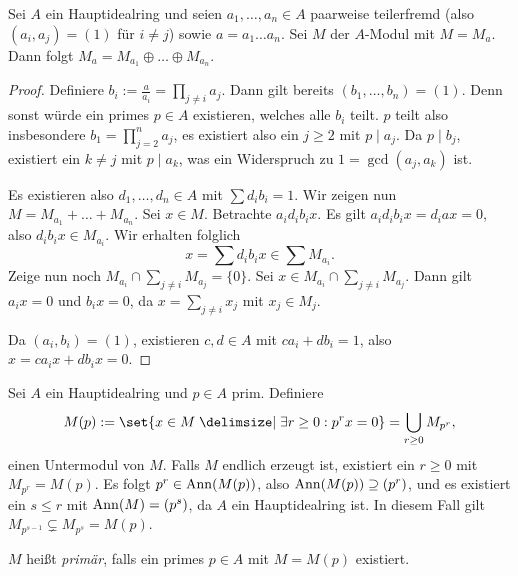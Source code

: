 \documentclass[12pt,a4paper]{scrartcl}
\theoremstyle{cplain}
\theoremstyle{cdef}
\begin{document}
\begin{lem} \label{lem:zerlegung ueber hir}
	Sei $A$ ein Hauptidealring und seien $a_1,\dots, a_n\in A$ paarweise teilerfremd (also $(a_i, a_j) = (1)$ für $i \neq j$) sowie $a = a_1\dots a_n$. Sei $M$ der $A$-Modul mit $M = M_a$. Dann folgt $M_a = M_{a_1}\oplus \dots \oplus M_{a_n}$.
\end{lem}
\begin{proof}
	Definiere $b_i := \frac{a}{a_i} = \prod_{j\neq i} a_j$. Dann gilt bereits $(b_1,\dots, b_n) = (1)$. Denn sonst würde ein primes $p\in A$ existieren, welches alle $b_i$ teilt. $p$ teilt also insbesondere $b_1 = \prod_{j = 2}^n a_j$, es existiert also ein $j\ge 2$ mit $p \mid a_j$. Da $p \mid b_j$, existiert ein $k\neq j$ mit $p \mid a_k$, was ein Widerspruch zu $1 = \gcd(a_j,a_k)$ ist.
	
	Es existieren also $d_1,\dots, d_n\in A$ mit $\sum d_ib_i = 1$. Wir zeigen nun $M = M_{a_1}+\dots +M_{a_n}$. Sei $x\in M$. Betrachte $a_id_ib_ix$. Es gilt $a_id_ib_ix = d_iax = 0$, also $d_ib_ix\in M_{a_i}$. Wir erhalten folglich \[ x = \sum d_ib_ix \in \sum M_{a_i}. \]
	Zeige nun noch $M_{a_i}\cap \sum_{j\neq i}M_{a_j} = \{0\}$. Sei $x\in M_{a_i}\cap\sum_{j \neq i}M_{a_j}$. Dann gilt $a_ix = 0$ und $b_ix = 0$, da $x = \sum_{j \neq i} x_j$ mit $x_j\in M_j$.
	
	Da $(a_i,b_i)= (1)$, existieren $c,d\in A$ mit $ca_i+db_i = 1$, also $x = ca_ix+db_ix = 0$.
\end{proof}

\begin{defi}
	Sei $A$ ein Hauptidealring und $p\in A$ prim. Definiere
	\[M(p) := \set{x\in M \given \exists r\ge 0: p^rx = 0} = \bigcup\limits_{r\ge 0} M_{p^r}, \]
	einen Untermodul von $M$. Falls $M$ endlich erzeugt ist, existiert ein $r\ge 0$ mit $M_{p^r} = M(p)$. Es folgt $p^r\in \operatorname{Ann}(M(p))$, also $\operatorname{Ann}(M(p))\supseteq (p^r)$, und es existiert ein $s\le r$ mit $\operatorname{Ann}(M) = (p^s)$, da $A$ ein Hauptidealring ist. In diesem Fall gilt $M_{p^{s-1}}\subsetneq M_{p^s} = M(p)$.
	
	$M$ heißt \emph{primär}, falls ein primes $p\in A$ mit $M = M(p)$ existiert.
\end{defi}	
\end{document}
